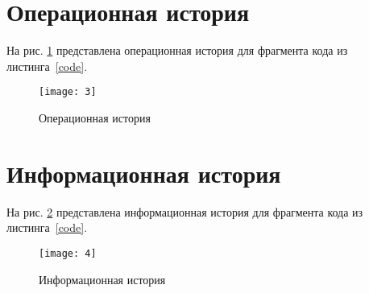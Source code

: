 \section{Операционная история}
На рис. \ref{img:3} представлена операционная история для фрагмента кода из листинга~\ref{code}.

\noindent
\begin{figure}[h!]
	\centering
    \texttt{[image: 3]}
    \caption{Операционная история}
    \label{img:3}
\end{figure}

\section{Информационная история}
На рис. \ref{img:4} представлена информационная история для фрагмента кода из листинга~\ref{code}.

\noindent
\begin{figure}[h!]
	\centering
    \texttt{[image: 4]}
    \caption{Информационная история}
    \label{img:4}
\end{figure}

\newpage